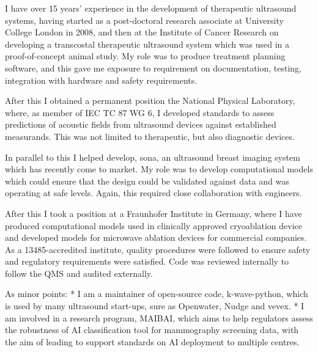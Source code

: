 I have over 15 years' experience in the development of therapeutic ultrasound systems, having started as a post-doctoral research associate at University College London in 2008, and then at the Institute of Cancer Research on developing a transcostal therapeutic ultrasound system which was used in a proof-of-concept animal study. My role was to produce treatment planning software, and this gave me exposure to requirement on documentation, testing, integration with hardware and safety requirements. 

After this I obtained a permanent position the National Physical Laboratory, where, as member of IEC TC 87 WG 6, I developed standards to assess predictions of acoustic fields from ultrasound devices against established measurands. This was not limited to therapeutic, but also diagnostic devices. 

In parallel to this I helped develop, sona, an ultrasound breast imaging system which has recently come to market. My role was to develop computational models which could ensure that the design could be validated against data and was operating at safe levels. Again, this required close collaboration with engineers.

After this I took a position at a Fraunhofer Institute in Germany, where I have produced computational models used in clinically approved cryoablation device and developed models for microwave ablation devices for commercial companies. As a 13485-accredited institute, quality procedures were followed to ensure safety and regulatory requirements were satisfied. Code was reviewed internally to follow the QMS and audited externally.

As minor points:
* I am a maintainer of open-source code, k-wave-python, which is used by many ultrasound start-ups, sure as Openwater, Nudge and vevex.
* I am involved in a research program, MAIBAI, which aims to help regulators assess the robustness of AI classification tool for mammography screening data, with the aim of leading to support standards on AI deployment to multiple centres.

